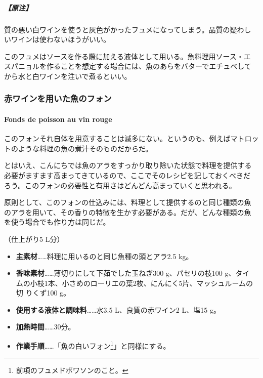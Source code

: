 \begin{recette}
\hypertarget{nota-fumet-de-poisson}{%
\subparagraph{【原注】}\label{nota-fumet-de-poisson}}

質の悪い白ワインを使うと灰色がかったフュメになってしまう。品質の疑わし
いワインは使わないほうがいい。

このフュメはソースを作る際に加える液体として用いる。魚料理用ソース・エ
スパニョルを作ることを想定する場合には、魚のあらをバターでエチュベして
から水と白ワインを注いで煮るといい。

\maeaki

\hypertarget{fondsdepoissonvinrouge}{%
\subsubsection{赤ワインを用いた魚のフォン}\label{fondsdepoissonvinrouge}}

\hypertarget{fonds-de-poisson-au-vin-rouge}{%
\paragraph{Fonds de poisson au vin
rouge}\label{fonds-de-poisson-au-vin-rouge}}


このフォンそれ自体を用意することは滅多にない。というのも、例えばマトロッ
トのような料理の魚の煮汁そのものだからだ。

とはいえ、こんにちでは魚のアラをすっかり取り除いた状態で料理を提供する
必要がますます高まってきているので、ここでそのレシピを記しておくべきだ
ろう。このフォンの必要性と有用さはどんどん高まっていくと思われる。

原則として、このフォンの仕込みには、料理として提供するのと同じ種類の魚
のアラを用いて、その香りの特徴を生かす必要がある。だが、どんな種類の魚
を使う場合でも作り方は同じだ。

（仕上がり5 L分）

\begin{itemize}
\item
  \textbf{主素材}\ldots{}\ldots{}料理に用いるのと同じ魚種の頭とアラ2.5
  kg。
\item
  \textbf{香味素材}\ldots{}\ldots{}薄切りにして下茹でした玉ねぎ300
  g、パセリの枝100 g、タイ
  ムの小枝1本、小さめのローリエの葉2枚、にんにく5片、マッシュルームの切
  りくず100 g。
\item
  \textbf{使用する液体と調味料}\ldots{}\ldots{}水3.5 L、良質の赤ワイン2
  L、塩15 g。
\item
  \textbf{加熱時間}\ldots{}\ldots{}30分。
\item
  \textbf{作業手順}\ldots{}\ldots{}「魚の白いフォン\footnote{前項のフュメドポワソンのこと。}」と同様にする。
\end{itemize}


\end{recette}
